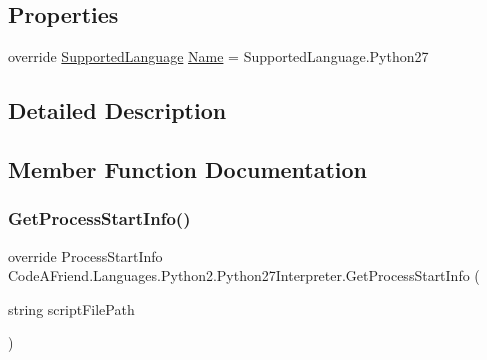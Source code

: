 \subsection*{Properties}
\begin{DoxyCompactItemize}
\item 
override \mbox{\hyperlink{namespace_code_a_friend_1_1_data_model_a13e088c525db1b03a4de75420ced79b2}{Supported\+Language}} \mbox{\hyperlink{class_code_a_friend_1_1_languages_1_1_python2_1_1_python27_interpreter_aeae6049e330cf5a2d73e11b242b62b62}{Name}} = Supported\+Language.\+Python27
\end{DoxyCompactItemize}


\subsection{Detailed Description}




\subsection{Member Function Documentation}
\mbox{\label{class_code_a_friend_1_1_languages_1_1_python2_1_1_python27_interpreter_a24b4f1f296ab282b0fcac3951af0a73b}} 
\subsubsection{\texorpdfstring{Get\+Process\+Start\+Info()}{GetProcessStartInfo()}}
{\footnotesize\ttfamily override Process\+Start\+Info Code\+A\+Friend.\+Languages.\+Python2.\+Python27\+Interpreter.\+Get\+Process\+Start\+Info (\begin{DoxyParamCaption}\item[{string}]{script\+File\+Path }\end{DoxyParamCaption})\hspace{0.3cm}{\ttfamily [virtual]}}

